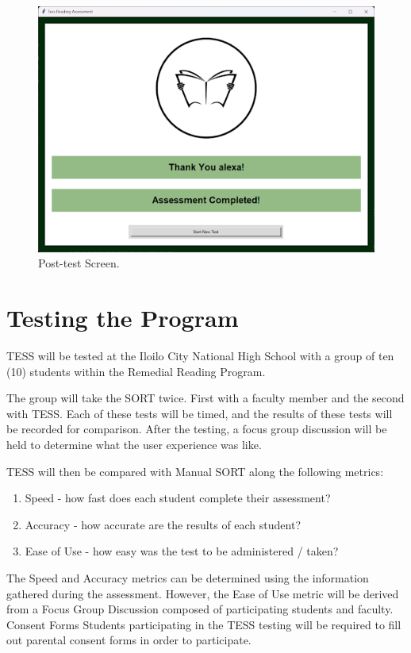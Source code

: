 \begin{figure}[!]
   \centering
   \includegraphics[scale = 0.6]{figures/Post-test-Screen.png}
   \caption{Post-test Screen.}
    \label{fig:posttestScreen}
\end{figure}

{\clearpage}

\section{Testing the Program}
TESS will be tested at the Iloilo City National High School with a group of ten (10) students within the Remedial Reading Program.

The group will take the SORT twice. First with a faculty member and the second with TESS. Each of these tests will be timed, and the results of these tests will be recorded for comparison.
After the testing, a focus group discussion will be held to determine what the user experience was like.

TESS will then be compared with Manual SORT along the following metrics:
\begin{enumerate}
\item Speed - how fast does each student complete their assessment?
\item Accuracy - how accurate are the results of each student?
\item Ease of Use - how easy was the test to be administered / taken?
\end{enumerate}

The Speed and Accuracy metrics can be determined using the information gathered during the assessment. However, the Ease of Use metric will be derived from a Focus Group Discussion composed of participating students and faculty.
Consent Forms
Students participating in the TESS testing will be required to fill out parental consent forms in order to participate. 

